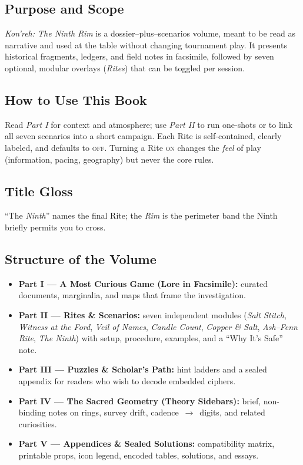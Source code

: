\documentclass[11pt]{article}
\numberwithin{equation}{section} %
\theoremstyle{plain} %
\theoremstyle{definition} %
\theoremstyle{remark} %
\begin{document}
\subsection{Purpose and Scope}
\textit{Kon'reh: The Ninth Rim} is a dossier–plus–scenarios volume, meant to be read as narrative and used at the table without changing tournament play. It presents historical fragments, ledgers, and field notes in facsimile, followed by seven optional, modular overlays (\emph{Rites}) that can be toggled per session.

\subsection{How to Use This Book}
Read \emph{Part I} for context and atmosphere; use \emph{Part II} to run one-shots or to link all seven scenarios into a short campaign. Each Rite is self-contained, clearly labeled, and defaults to \textsc{off}. Turning a Rite \textsc{on} changes the \emph{feel} of play (information, pacing, geography) but never the core rules.

\subsection{Title Gloss}
“The \emph{Ninth}” names the final Rite; the \emph{Rim} is the perimeter band the Ninth briefly permits you to cross.

\subsection{Structure of the Volume}
\begin{itemize}
  \item \textbf{Part I — A Most Curious Game (Lore in Facsimile):} curated documents, marginalia, and maps that frame the investigation.
  \item \textbf{Part II — Rites \& Scenarios:} seven independent modules (\emph{Salt Stitch}, \emph{Witness at the Ford}, \emph{Veil of Names}, \emph{Candle Count}, \emph{Copper \& Salt}, \emph{Ash–Fenn Rite}, \emph{The Ninth}) with setup, procedure, examples, and a “Why It’s Safe” note.
  \item \textbf{Part III — Puzzles \& Scholar’s Path:} hint ladders and a sealed appendix for readers who wish to decode embedded ciphers.
  \item \textbf{Part IV — The Sacred Geometry (Theory Sidebars):} brief, non-binding notes on rings, survey drift, cadence~$\to$~digits, and related curiosities.
  \item \textbf{Part V — Appendices \& Sealed Solutions:} compatibility matrix, printable props, icon legend, encoded tables, solutions, and essays.
\end{itemize}
\end{document}
